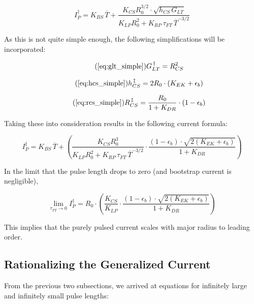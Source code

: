 \begin{equation}
	I_P^\dagger = K_{BS} \, \overline T + \frac{ K_{CS} R_0^{3/2} \cdot \sqrt{ h_{CS} \, G_{LT} } }{ K_{LP} R_0^2 + K_{RP} \, \tau_{FT} \, \overline T ^ {-3/2} }
\end{equation}

As this is not quite simple enough, the following simplifications will be incorporated:

\begin{equation}
	\tag{\ref{eq:glt_simple}}
	G_{LT}^{\,\dagger} = R_{CS}^2
\end{equation}

\begin{equation}
	\tag{\ref{eq:hcs_simple}}
	h_{CS}^{\,\ddagger} = 2 R_0 \cdot \left( K_{EK} + \epsilon_b \right) 
\end{equation}

\begin{equation}
	\tag{\ref{eq:rcs_simple}}
	R_{CS}^{\,\ddagger} = \frac{ R_0 }{ 1 + K_{DR} } \cdot \left( 1 - \epsilon_b  \right)
\end{equation}

Taking these into consideration results in the following current formula:

\begin{equation}
	I_P^\ddagger = K_{BS} \, \overline T + \left( \frac{ K_{CS} R_0^3 }{ K_{LP} R_0^2 + K_{RP} \, \tau_{FT} \, \overline T ^ {-3/2} } \cdot \frac{ ( 1 - \epsilon_b ) \cdot \sqrt{ 2 ( K_{EK} + \epsilon_b ) } }{ 1 + K_{DR} } \right)
\end{equation}

In the limit that the pulse length drops to zero (and bootstrap current is negligible),

\begin{equation}
	\label{eq:tau_zero}
	\lim_{ \tau_{FT} \to 0 } I_P^\ddagger = R_0 \cdot \left( \frac{ K_{CS} }{ K_{LP} } \cdot \frac{ ( 1 - \epsilon_b ) \cdot \sqrt{ 2 ( K_{EK} + \epsilon_b ) } }{ 1 + K_{DR} } \right)
\end{equation}

This implies that the purely pulsed current scales with major radius to leading order.

\subsection{Rationalizing the Generalized Current}

From the previous two subsections, we arrived at equations for infinitely large and infinitely small pulse lengths:


